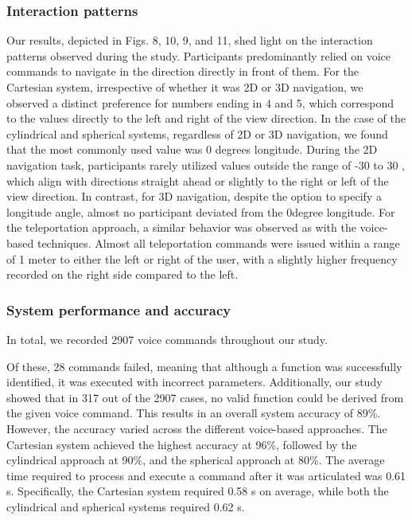 \documentclass[preprint,12pt]{elsarticle}
\newcommand{\reftext}[1]{{\color{gray}#1}}   %
\begin{document}
\subsubsection{Interaction patterns}
\reftext{Our results, depicted in Figs. 8, 10, 9, and 11, shed light on the interaction patterns observed during the study. Participants predominantly relied on voice commands to navigate in the direction directly in front of them. For the Cartesian system, irrespective of whether it was 2D or 3D navigation, we observed a distinct preference for numbers ending in 4 and 5, which correspond to the values directly to the left and right of the view direction. In the case of the cylindrical and spherical systems, regardless of 2D or 3D navigation, we found that the most commonly used value was 0 degrees longitude. During the 2D navigation task, participants rarely utilized values outside the range of -30 to 30 , which align with directions straight ahead or slightly to the right or left of the view direction. In contrast, for 3D navigation, despite the option to specify a longitude angle, almost no participant deviated from the 0degree longitude. For the teleportation approach, a similar behavior was observed as with the voice-based techniques. Almost all teleportation commands were issued within a range of 1 meter to either the left or right of the user, with a slightly higher frequency recorded on the right side compared to the left.}

\subsubsection{System performance and accuracy}
\reftext{In total, we recorded 2907 voice commands throughout our study.}

\reftext{Of these, 28 commands failed, meaning that although a function was successfully identified, it was executed with incorrect parameters. Additionally, our study showed that in 317 out of the 2907 cases, no valid function could be derived from the given voice command. This results in an overall system accuracy of 89\%. However, the accuracy varied across the different voice-based approaches. The Cartesian system achieved the highest accuracy at 96\%, followed by the cylindrical approach at 90\%, and the spherical approach at 80\%. The average time required to process and execute a command after it was articulated was 0.61 s. Specifically, the Cartesian system required 0.58 s on average, while both the cylindrical and spherical systems required 0.62 s.}
\end{document}
